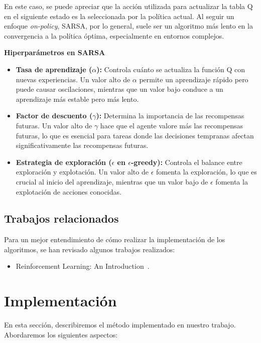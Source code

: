 \documentclass[conference,a4paper]{IEEEtran}
\begin{document}
En este caso, se puede apreciar que la acción utilizada para actualizar la tabla Q en el siguiente estado es la seleccionada por la política actual. Al seguir un enfoque \textit{on-policy}, SARSA, por lo general, suele ser un algoritmo más lento en la convergencia a la política óptima, especialmente en entornos complejos.\newline

\textbf{Hiperparámetros en SARSA}
\begin{itemize}
  \item \textbf{Tasa de aprendizaje (\(\alpha\)):} Controla cuánto se actualiza la función Q con nuevas experiencias. Un valor alto de \(\alpha\) permite un aprendizaje rápido pero puede causar oscilaciones, mientras que un valor bajo conduce a un aprendizaje más estable pero más lento.
  \item \textbf{Factor de descuento (\(\gamma\)):} Determina la importancia de las recompensas futuras. Un valor alto de \(\gamma\) hace que el agente valore más las recompensas futuras, lo que es esencial para tareas donde las decisiones tempranas afectan significativamente las recompensas futuras.
  \item \textbf{Estrategia de exploración (\(\epsilon\) en \(\epsilon\)-greedy):} Controla el balance entre exploración y explotación. Un valor alto de \(\epsilon\) fomenta la exploración, lo que es crucial al inicio del aprendizaje, mientras que un valor bajo de \(\epsilon\) fomenta la explotación de acciones conocidas.\newline
\end{itemize}

\subsection{Trabajos relacionados}
Para un mejor entendimiento de cómo realizar la implementación de los algoritmos, se han revisado algunos trabajos realizados:
\begin{itemize}
  \item Reinforcement Learning: An Introduction~\cite{b1}.
\end{itemize}

\section{Implementación}

En esta sección, describiremos el método implementado en nuestro trabajo. Abordaremos los siguientes aspectos:
\end{document}
